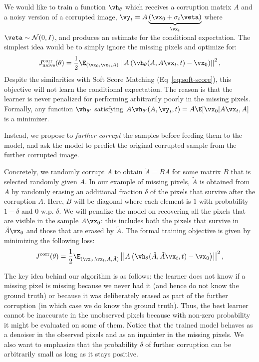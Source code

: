 \documentclass{article}
\begin{document}
We would like to train a function $\vh_\theta$ which receives a corruption matrix $A$ and a noisy version of a corrupted image, $\vy_t = A\underbrace{(\vx_0 + \sigma_t \veta)}_{\vx_t}$ where $\veta \sim \mathcal{N}(0,I)$, and produces an estimate for the conditional expectation.
The simplest idea would be to simply ignore the missing pixels and optimize for:
\begin{gather}\label{eq:naive-objective}
    J^{\mathrm{corr}}_{\mathrm{naive}}(\theta) =  \frac{1}{2}\E_{(\vx_0, \vx_t, A)}\left|\left| A\left(\vh_{\theta}(A, A\vx_t, t) - \vx_0\right)\right|\right|^2,
\end{gather}
Despite the similarities with Soft Score Matching (Eq~\ref{eq:soft-score}), this objective will not learn the conditional expectation. The reason is that the learner is never penalized for performing arbitrarily poorly in the missing pixels. Formally, any function $\vh_{\theta'}$ satisfying $A \vh_{\theta'}(A, \vy_t, t) = A \E[\vx_0 | A\vx_t, A]$ is a minimizer. %

Instead, we propose 
to \emph{further corrupt} the samples before feeding them to the model, and ask the model to predict the original corrupted sample from the further corrupted image.

Concretely, we randomly corrupt $A$ to obtain $\tilde{A} = BA$ for some matrix $B$ that is selected randomly given $A$. 
In our example of missing pixels, $\tilde{A}$ is obtained from $A$ by randomly erasing an additional fraction $\delta$ of the pixels that survive after the corruption $A$. Here, $B$ will be diagonal where each element is $1$ with probability $1-\delta$ and $0$ w.p. $\delta$. We will penalize the model on recovering all the pixels that are visible in the sample $A\vx_0$: this includes both the pixels that survive in $\tilde{A}\vx_0$ and those that are erased by $\tilde{A}$. 
The formal training objective is given by minimizing the following loss:
\begin{equation}\label{eq:opt}
    J^{\mathrm{corr}}(\theta) =  \frac{1}{2}\E_{(\vx_0, \vx_t, A, \tilde{A})}\left|\left| A\left(\vh_{\theta}(\tilde{A}, \tilde{A}\vx_t, t) - \vx_0\right)\right|\right|^2,
\end{equation}

The key idea behind our algorithm is as follows: the learner does not know if a missing pixel is missing because we never had it (and hence do not know the ground truth) or because it was deliberately erased as part of the further corruption (in which case we do know the ground truth). Thus, the best learner cannot be inaccurate in the unobserved pixels because with non-zero probability it might be evaluated on some of them. Notice that the trained model behaves as a denoiser in the observed pixels and as an inpainter in the missing pixels. We also want to emphasize that the probability $\delta$ of further corruption can be arbitrarily small as long as it stays positive.
\end{document}
